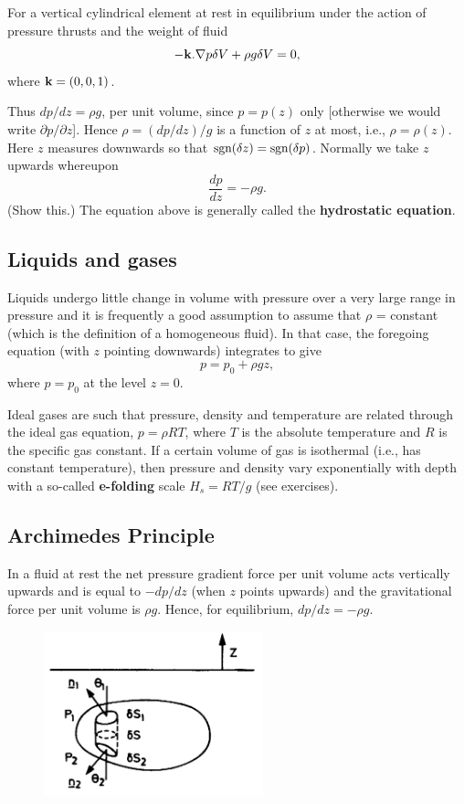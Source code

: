 \documentclass[10pt]{report}
\begin{document}
For a vertical cylindrical element at rest in equilibrium under the action
of pressure thrusts and the weight of fluid
\[-{{\bf k}}. \nabla p\delta V+\rho g\delta
V=0,\]
 where ${{\bf k}}=(0,0,1)$.

Thus ${dp}/{dz}=\rho g$, per unit volume, since $p =
p(z)$ only [otherwise we would write $\partial p/\partial z$].
Hence $\rho ={\left( {{dp}/ {dz}} \right)} / g$ is a function of $z$ at most, i.e., $\rho  =
\rho (z)$. Here $z$ measures downwards so that $\hbox{sgn} (\delta z) = \hbox{sgn}
(\delta p)$. Normally we take $z$ upwards whereupon
\[
\frac{dp}{dz}=-\rho g.
\]
(Show this.) The equation above is generally called the \textbf{hydrostatic
equation}.

\subsection{Liquids and gases}
Liquids undergo little change in volume with pressure over a very large
range in pressure and it is frequently a good assumption to assume that
$\rho $ = constant (which is the definition of a homogeneous fluid). In that
case, the foregoing equation (with $z$ pointing downwards) integrates to give
\[
p=p_0 +\rho gz ,
\]
where $p = p_{0}$ at the level $z = 0$.

Ideal gases are such that pressure, density and temperature are related
through the ideal gas equation, $p = \rho RT$, where $T$ is the absolute
temperature and $R$ is the specific gas constant. If a certain volume of gas
is isothermal (i.e., has constant temperature), then pressure and density
vary exponentially with depth with a so-called \textbf{e-folding} scale
$H_{s} = RT/g$ (see exercises).

\subsection{Archimedes Principle}
In a fluid at rest the net pressure gradient force per unit volume acts
vertically upwards and is equal to $-dp/dz$ (when $z$ points upwards) and the
gravitational force per unit volume is $\rho g$. Hence, for equilibrium,
$dp/dz = -\rho g$.

\begin{figure}
\centerline{\includegraphics[width=2.5in]{Section28.pdf}}
\label{fig1.8}
\caption{ }
\end{figure}
\end{document}
